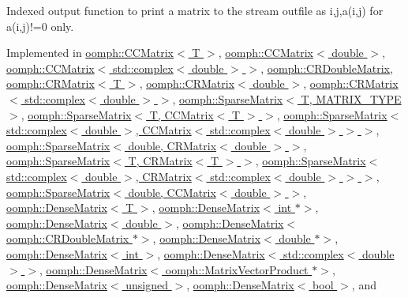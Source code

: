 Indexed output function to print a matrix to the stream outfile as i,j,a(i,j) for a(i,j)!=0 only. 



Implemented in \hyperlink{classoomph_1_1CCMatrix_a1f6e451f0688c392e45bc03bf20fdda7}{oomph\+::\+C\+C\+Matrix$<$ T $>$}, \hyperlink{classoomph_1_1CCMatrix_a1f6e451f0688c392e45bc03bf20fdda7}{oomph\+::\+C\+C\+Matrix$<$ double $>$}, \hyperlink{classoomph_1_1CCMatrix_a1f6e451f0688c392e45bc03bf20fdda7}{oomph\+::\+C\+C\+Matrix$<$ std\+::complex$<$ double $>$ $>$}, \hyperlink{classoomph_1_1CRDoubleMatrix_a468055aa2e36ff270a769a74c9ac2856}{oomph\+::\+C\+R\+Double\+Matrix}, \hyperlink{classoomph_1_1CRMatrix_af34167172020d60e5fa382e4bd5d6466}{oomph\+::\+C\+R\+Matrix$<$ T $>$}, \hyperlink{classoomph_1_1CRMatrix_af34167172020d60e5fa382e4bd5d6466}{oomph\+::\+C\+R\+Matrix$<$ double $>$}, \hyperlink{classoomph_1_1CRMatrix_af34167172020d60e5fa382e4bd5d6466}{oomph\+::\+C\+R\+Matrix$<$ std\+::complex$<$ double $>$ $>$}, \hyperlink{classoomph_1_1SparseMatrix_a84a08f7e77be50af6a5655cbe0609619}{oomph\+::\+Sparse\+Matrix$<$ T, M\+A\+T\+R\+I\+X\+\_\+\+T\+Y\+P\+E $>$}, \hyperlink{classoomph_1_1SparseMatrix_a84a08f7e77be50af6a5655cbe0609619}{oomph\+::\+Sparse\+Matrix$<$ T, C\+C\+Matrix$<$ T $>$ $>$}, \hyperlink{classoomph_1_1SparseMatrix_a84a08f7e77be50af6a5655cbe0609619}{oomph\+::\+Sparse\+Matrix$<$ std\+::complex$<$ double $>$, C\+C\+Matrix$<$ std\+::complex$<$ double $>$ $>$ $>$}, \hyperlink{classoomph_1_1SparseMatrix_a84a08f7e77be50af6a5655cbe0609619}{oomph\+::\+Sparse\+Matrix$<$ double, C\+R\+Matrix$<$ double $>$ $>$}, \hyperlink{classoomph_1_1SparseMatrix_a84a08f7e77be50af6a5655cbe0609619}{oomph\+::\+Sparse\+Matrix$<$ T, C\+R\+Matrix$<$ T $>$ $>$}, \hyperlink{classoomph_1_1SparseMatrix_a84a08f7e77be50af6a5655cbe0609619}{oomph\+::\+Sparse\+Matrix$<$ std\+::complex$<$ double $>$, C\+R\+Matrix$<$ std\+::complex$<$ double $>$ $>$ $>$}, \hyperlink{classoomph_1_1SparseMatrix_a84a08f7e77be50af6a5655cbe0609619}{oomph\+::\+Sparse\+Matrix$<$ double, C\+C\+Matrix$<$ double $>$ $>$}, \hyperlink{classoomph_1_1DenseMatrix_a6e9084acc11e036d4c5f7e5322d12034}{oomph\+::\+Dense\+Matrix$<$ T $>$}, \hyperlink{classoomph_1_1DenseMatrix_a6e9084acc11e036d4c5f7e5322d12034}{oomph\+::\+Dense\+Matrix$<$ int $\ast$$>$}, \hyperlink{classoomph_1_1DenseMatrix_a6e9084acc11e036d4c5f7e5322d12034}{oomph\+::\+Dense\+Matrix$<$ double $>$}, \hyperlink{classoomph_1_1DenseMatrix_a6e9084acc11e036d4c5f7e5322d12034}{oomph\+::\+Dense\+Matrix$<$ oomph\+::\+C\+R\+Double\+Matrix $\ast$$>$}, \hyperlink{classoomph_1_1DenseMatrix_a6e9084acc11e036d4c5f7e5322d12034}{oomph\+::\+Dense\+Matrix$<$ double $\ast$$>$}, \hyperlink{classoomph_1_1DenseMatrix_a6e9084acc11e036d4c5f7e5322d12034}{oomph\+::\+Dense\+Matrix$<$ int $>$}, \hyperlink{classoomph_1_1DenseMatrix_a6e9084acc11e036d4c5f7e5322d12034}{oomph\+::\+Dense\+Matrix$<$ std\+::complex$<$ double $>$ $>$}, \hyperlink{classoomph_1_1DenseMatrix_a6e9084acc11e036d4c5f7e5322d12034}{oomph\+::\+Dense\+Matrix$<$ oomph\+::\+Matrix\+Vector\+Product $\ast$$>$}, \hyperlink{classoomph_1_1DenseMatrix_a6e9084acc11e036d4c5f7e5322d12034}{oomph\+::\+Dense\+Matrix$<$ unsigned $>$}, \hyperlink{classoomph_1_1DenseMatrix_a6e9084acc11e036d4c5f7e5322d12034}{oomph\+::\+Dense\+Matrix$<$ bool $>$}, and 